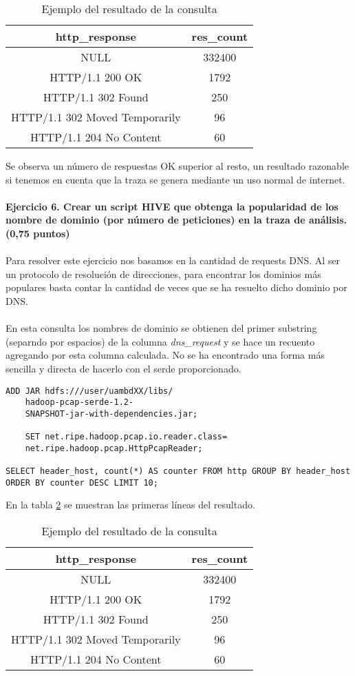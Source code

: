 \begin{table}[ht]
	\centering
	\caption{Ejemplo del resultado de la consulta}
	\begin{tabular}[t]{cc}
		http\_response & res\_count \\
		\hline
		NULL &	332400\\
		HTTP/1.1 200 OK&	1792\\
		HTTP/1.1 302 Found&	250\\
		HTTP/1.1 302 Moved Temporarily&	96\\
		HTTP/1.1 204 No Content&	60\\
	\end{tabular}
	\label{tab:c5}
\end{table}%
Se observa un número de respuestas OK superior al resto, un resultado razonable si tenemos en cuenta que la traza se genera mediante un uso normal de internet.\\\\
\textbf{Ejercicio 6. Crear un script HIVE que obtenga la popularidad de los nombre de dominio (por número de
	peticiones) en la traza de análisis. (0,75 puntos)}\\\\
Para resolver este ejercicio nos basamos en la cantidad de requests DNS. Al ser un protocolo de resolución de direcciones, para encontrar los dominios más populares basta contar la cantidad de veces que se ha resuelto dicho dominio por DNS.\\\\
En esta consulta los nombres de dominio se obtienen del primer substring (separndo por espacios) de la columna \textit{dns\_request} y se hace un recuento agregando por esta columna calculada. No se ha encontrado una forma más sencilla y directa de hacerlo con el serde proporcionado.
\begin{lstlisting}[caption=Consulta para obtener el ranking de dominios]
	ADD JAR hdfs:///user/uambdXX/libs/
	hadoop-pcap-serde-1.2-
	SNAPSHOT-jar-with-dependencies.jar;
	
	SET net.ripe.hadoop.pcap.io.reader.class=
	net.ripe.hadoop.pcap.HttpPcapReader;
	
SELECT header_host, count(*) AS counter FROM http GROUP BY header_host ORDER BY counter DESC LIMIT 10;
\end{lstlisting}
En la tabla \ref{tab:c5} se muestran las primeras líneas del resultado.

\begin{table}[ht]
	\centering
	\caption{Ejemplo del resultado de la consulta}
	\begin{tabular}[t]{cc}
		http\_response & res\_count \\
		\hline
		NULL &	332400\\
		HTTP/1.1 200 OK&	1792\\
		HTTP/1.1 302 Found&	250\\
		HTTP/1.1 302 Moved Temporarily&	96\\
		HTTP/1.1 204 No Content&	60\\
	\end{tabular}
	\label{tab:c5}
\end{table}%
